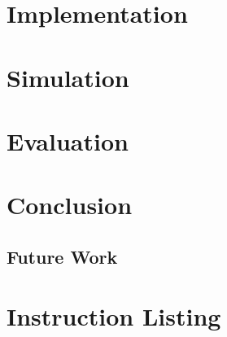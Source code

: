 \documentclass[oneside]{book}
\begin{document}

\chapter{Implementation}


\chapter{Simulation}


\chapter{Evaluation}


\chapter{Conclusion}

\section{Future Work}


\appendix

\chapter{Instruction Listing}


\end{document}

